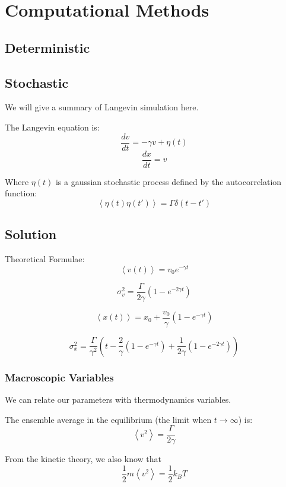 
\chapter{Computational Methods}

\section{Deterministic}
\section{Stochastic}


We will give a summary of Langevin simulation here. 

The Langevin equation is:
\[
\boxed{\frac{dv}{dt} = -\gamma v + \eta\left(t\right)}
\]
$$ \frac{dx}{dt} = v $$

Where $\eta\left(t\right)$ is a gaussian stochastic process defined by the autocorrelation function:
$$ \left< \eta\left(t\right) \eta\left(t'\right)\right> = \Gamma \delta\left(t - t'\right) $$

\section{Solution} 

Theoretical Formulae:
$$ \boxed{\left<v(t)\right> = v_{0} e^{-\gamma t}} $$

$$ \boxed{\sigma_{v}^{2} = \frac{\Gamma}{2\gamma}
\left(1 - e^{-2\gamma t}\right)}$$

$$ \boxed{\left<x(t)\right> = x_{0} + \frac{v_{0}}{\gamma}\left(1 - e^{-\gamma t}\right)}$$

$$ \boxed{\sigma_{x}^{2} = \frac{\Gamma}{\gamma^{2}} \left(t - \frac{2}{\gamma}(1-e^{-\gamma t}) + \frac{1}{2\gamma}\left(1-e^{-2\gamma t}\right) \right)}$$

\subsection{Macroscopic Variables}

We can relate our parameters with thermodynamics variables.

The ensemble average in the equilibrium (the limit when $t \rightarrow \infty$) is:
$$ \left< v^{2} \right> = \frac{\Gamma}{2\gamma} $$

From the kinetic theory, we also know that
$$ \frac{1}{2} m \left< v^{2} \right> = \frac{1}{2}k_{B}T $$

